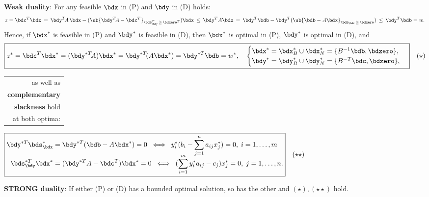 \documentclass[a4paper]{article}
\begin{document}
\bigskip
\textbf{Weak duality}: For any feasible $\bdx$ in (P) and $\bdy$ in (D) holds:
\[
  z = \bdc^T\bdx
    \,=\, \bdy^T\!A\,\bdx-(\ub  {\bdy^T\!A-\bdc^T}_{\bds_\bdy^T\,\ge\,\bdzero^T})\bdx
    \,\le\, \bdy^TA\bdx
    \,=\, \bdy^T\bdb - \bdy^T(\ub{\bdb-A\bdx}_{\bds_\bdx\,\ge\,\bdzero})
    \,\le\, \bdy^T\bdb = w.
\]
  Hence, if $\bdx^*$ is feasible in (P) and
           $\bdy^*$ is feasible in (D),
           then
           $\bdx^*$ is optimal in (P),
           $\bdy^*$ is optimal in (D),
           and
    \[
      \boxed{
        z^*
        =\bdc^T\bdx^*
        =(\bdy^{*T}\!A)\bdx^*
        =\bdy^{*T}\!(A\bdx^*)
        =\bdy^{*T}\bdb
        =w^*,
        \quad
        \begin{cases}
          \bdx^* = \bdx_B^*\cup\bdx_N^*=\{B^{-1}\bdb,\bdzero\}, \\
          \bdy^* = \bdy_B^*\cup\bdy_N^*=\{B^{-T}\bdc,\bdzero\}, \\
        \end{cases}
      }
      \quad(\star)
    \]


\medskip %
\begin{tabular}{r}
  as well as \\
  \textbf{complementary} \\
  \textbf{slackness} hold \\
  {at both optima:} \\
\end{tabular}
\hspace{1em}
$
\boxed{
\begin{aligned}
  \bdy^{*T}\bds_\bdx^*
  &= \bdy^{*T}(\bdb-A\bdx^*)=0
  \;\iff\; y_i^*(b_i-\sum_{j=1}^{n} a_{ij}x_j^*) = 0, \;
   i=1,\ldots,m
\\[-7pt]
  \bds_\bdy^{*T}\bdx^*
  &= (\bdy^{*T}A-\bdc^T)\bdx^*=0 \;\iff\; (\sum_{i=1}^m y_i^*a_{ij}-c_j)x_j^* = 0,
  \; j=1,\ldots, n.\cr
\end{aligned}
}
\quad(\star\star)
$

\vspace{1em}
\textbf{STRONG duality}: If either (P) or (D) has a bounded optimal solution,
so has the other and $(\star),(\star\star)$ hold.


\vspace{-.7em}
\end{document}
